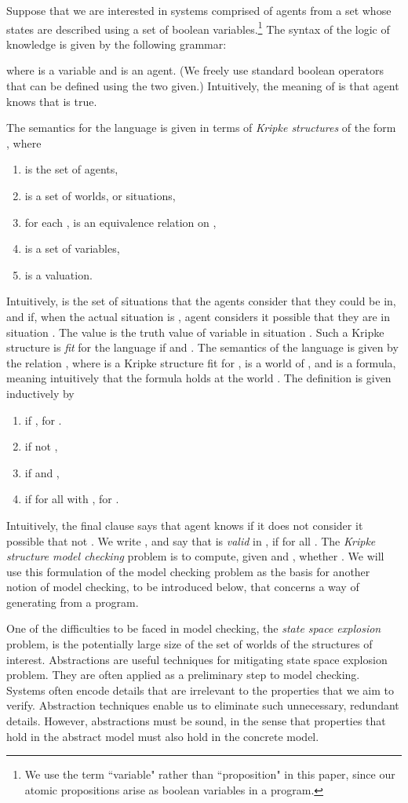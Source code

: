 \documentclass[]{llncs}
\newcommand{\be}{\begin{enumerate}}
\newcommand{\ee}{\end{enumerate}}
\begin{document}
Suppose that we are interested in systems comprised of  agents
from a set  whose states are described using a set  of 
boolean variables.\footnote{We use the term ``variable" rather than ``proposition" in this paper, since our
atomic propositions arise as boolean variables in a program.} 
The syntax of the  logic of knowledge 
is given by the following grammar: 

where  is a variable and  is an agent. 
(We freely use standard boolean operators that can be defined 
using the two given.) Intuitively, the meaning of  
is that agent  knows that  is true. 

The semantics for the language is given in terms of {\em Kripke structures} 
of the form  
, 
where 
\be 
\item  is the set of agents, 
\item  is a set of worlds, or situations,  
\item for each ,  is an equivalence relation on ,
\item  is a set of variables, 
\item  is a valuation. 
\ee 
Intuitively,  is the set of situations that the agents
consider that they could be in, and  if, 
when the actual situation is , agent  considers it possible that 
they are in situation . The value  is the truth value of variable
 in situation . Such a Kripke structure  is {\em fit} for the 
language  if  and 
.  The semantics of the language is given by the 
relation , where  is a Kripke structure fit for ,  
is a world of , 
and  is a formula, meaning intuitively that the formula  holds at the 
world . The definition is given inductively by 
\be 
\item  if , for . 
\item  if not , 
\item  if  and , 
\item  if  for all  with , for . 
\ee
Intuitively, the final clause says that 
agent  knows  if it does not consider it possible that not . 
We write , and say that  is {\em valid} in ,   if  for
all . The {\em Kripke structure model checking} problem  is to compute, given  and , 
whether .  We will use this formulation of the model checking problem as the basis for another 
notion of model checking, to be introduced below, that concerns a way of generating  from a program. 

One of the difficulties to be faced in model checking, the {\em state space explosion} problem, 
is the potentially large size of the set of worlds  of the structures  of interest. 
Abstractions are useful techniques for mitigating
state space explosion problem. They are often applied 
as a preliminary step to model checking. 
Systems often encode details
that are irrelevant to the properties that we aim
to verify. Abstraction techniques enable us to eliminate such unnecessary,  redundant details. 
However, abstractions must be sound, in the sense that properties that hold in the abstract model must
also hold in the concrete model.
\end{document}
